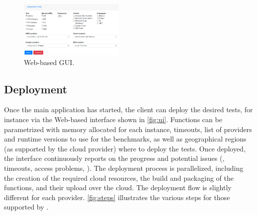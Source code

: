 \begin{figure}[!t]
\begin{center}
\includegraphics[width=0.45\textwidth]{bilder/ui.png}
\caption{\sys Web-based GUI.}
\label{fig:ui}
\end{center}
\end{figure}

\subsection{Deployment}

Once the main application has started, the client can deploy the desired tests, for instance via the Web-based interface shown in \autoref{fig:ui}.
Functions can be parametrized with memory allocated for each instance, timeouts, list of providers and runtime versions to use for the benchmarks, as well as geographical regions (as supported by the cloud provider) where to deploy the tests. 
Once deployed, the interface continuously reports on the progress and potential issues (\eg, timeouts, access problems, \etc). 
The deployment process is parallelized, including the creation of the required cloud resources, the build and packaging of the functions, and their upload over the cloud.
The deployment flow is slightly different for each provider. 
\autoref{fig:steps} illustrates the various steps for those supported by \sys.


